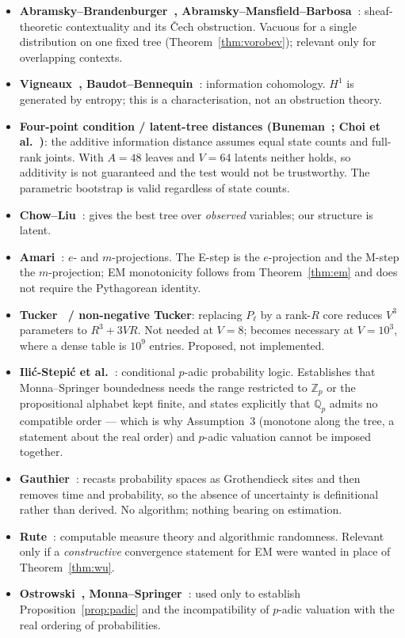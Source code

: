\begin{itemize}
\item \textbf{Abramsky--Brandenburger~\cite{ab2011}, Abramsky--Mansfield--Barbosa~\cite{amb2011}}:
      sheaf-theoretic contextuality and its \v{C}ech obstruction. Vacuous for a
      single distribution on one fixed tree
      (Theorem~\ref{thm:vorobev}); relevant only for overlapping contexts.
\item \textbf{Vigneaux~\cite{vigneaux2019}, Baudot--Bennequin~\cite{bb2015}}:
      information cohomology. $H^1$ is generated by entropy; this is a
      characterisation, not an obstruction theory.
\item \textbf{Four-point condition / latent-tree distances
      (Buneman~\cite{buneman1971}; Choi et al.~\cite{choi2011})}: the additive
      information distance assumes equal state counts and full-rank joints.
      With $A=48$ leaves and $V=64$ latents neither holds, so additivity is not
      guaranteed and the test would not be trustworthy. The parametric
      bootstrap is valid regardless of state counts.
\item \textbf{Chow--Liu~\cite{chowliu1968}}: gives the best tree over
      \emph{observed} variables; our structure is latent.
\item \textbf{Amari~\cite{amari2016}}: $e$- and $m$-projections. The E-step is
      the $e$-projection and the M-step the $m$-projection; EM monotonicity
      follows from Theorem~\ref{thm:em} and does not require the Pythagorean
      identity.
\item \textbf{Tucker~\cite{tucker1966} / non-negative Tucker}: replacing
      $P_\ell$ by a rank-$R$ core reduces $V^3$ parameters to $R^3+3VR$. Not
      needed at $V=8$; becomes necessary at $V=10^3$, where a dense table is
      $10^9$ entries. Proposed, not implemented.
\item \textbf{Ili\'c-Stepi\'c et al.~\cite{ilic2014}}: conditional $p$-adic
      probability logic. Establishes that Monna--Springer boundedness needs the
      range restricted to $\mathbb{Z}_p$ or the propositional alphabet kept
      finite, and states explicitly that $\mathbb{Q}_p$ admits no compatible
      order --- which is why Assumption~3 (monotone along the tree, a statement
      about the real order) and $p$-adic valuation cannot be imposed together.
\item \textbf{Gauthier~\cite{gauthier2014}}: recasts probability spaces as
      Grothendieck sites and then removes time and probability, so the absence
      of uncertainty is definitional rather than derived. No algorithm; nothing
      bearing on estimation.
\item \textbf{Rute~\cite{rute2019}}: computable measure theory and algorithmic
      randomness. Relevant only if a \emph{constructive} convergence statement
      for EM were wanted in place of Theorem~\ref{thm:wu}.
\item \textbf{Ostrowski~\cite{ostrowski1916}, Monna--Springer~\cite{ms1963}}:
      used only to establish Proposition~\ref{prop:padic} and the
      incompatibility of $p$-adic valuation with the real ordering of
      probabilities.
\end{itemize}


